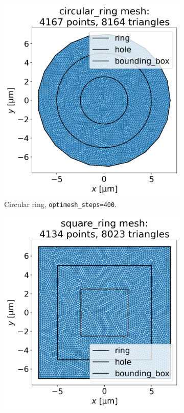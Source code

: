 \documentclass[preprint,12pt]{elsarticle}
\begin{document}
\begin{figure}
\centering
\begin{subfigure}{.4\textwidth}
  \centering
  \includegraphics[width=\linewidth]{examples/images/ring/circular_ring_mesh.png}
  \caption{Circular ring, \texttt{optimesh_steps=400}.}
  \label{fig:circular_ring_mesh}
\end{subfigure}%
\begin{subfigure}{.4\textwidth}
  \centering
  \includegraphics[width=\linewidth]{examples/images/ring/square_ring_mesh.png}

\end{subfigure}
\end{figure}
\end{document}
